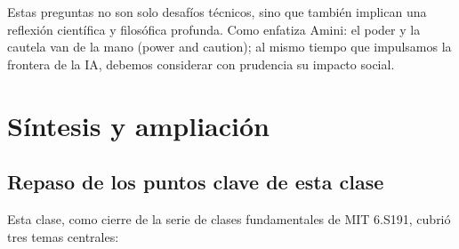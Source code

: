 \documentclass[a4paper]{article}
\begin{document}
Estas preguntas no son solo desafíos técnicos, sino que también implican una reflexión científica y filosófica profunda. Como enfatiza Amini: el poder y la cautela van de la mano (power and caution); al mismo tiempo que impulsamos la frontera de la IA, debemos considerar con prudencia su impacto social.

\section{Síntesis y ampliación}

\subsection{Repaso de los puntos clave de esta clase}

Esta clase, como cierre de la serie de clases fundamentales de MIT 6.S191, cubrió tres temas centrales:
\end{document}
